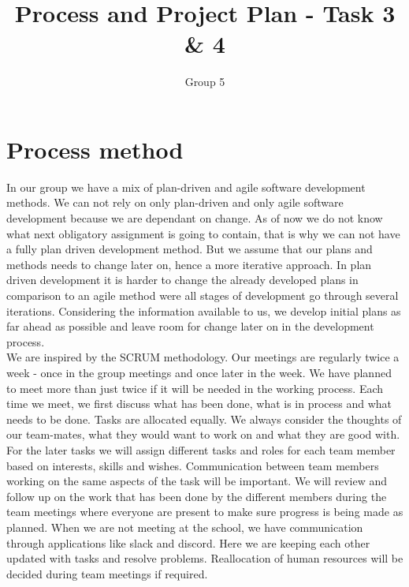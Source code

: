 \documentclass{article}
\title{Process and Project Plan - Task 3 \& 4}
\author{Group 5}
\date{}
\begin{document}
    \maketitle
    
    \section{Process method}
    \noindent
    In our group we have a mix of plan-driven and agile software development methods. We can not rely on only plan-driven and only agile software development because we are dependant on change. As of now we do not know what next obligatory assignment is going to contain, that is why we can not have a fully plan driven development method. But we assume that our plans and methods needs to change later on, hence a more iterative approach. In plan driven development it is harder to change the already developed plans in comparison to an agile method were all stages of development go through several iterations. Considering the information available to us, we develop initial plans as far ahead as possible and leave room for change later on in the development process. \\

    \noindent
    We are inspired by the SCRUM methodology. Our meetings are regularly twice a week - once in the group meetings and once later in the week. We have planned to meet more than just twice if it will be needed in the working process. Each time we meet, we first discuss what has been done, what is in process and what needs to be done. Tasks are allocated equally. We always consider the thoughts of our team-mates, what they would want to work on and what they are good with. \\
    
    \noindent
    For the later tasks we will assign different tasks and roles for each team member based on interests, skills and wishes. Communication between team members working on the same aspects of the task will be important. We will review and follow up on the work that has been done by the different members during the team meetings where everyone are present to make sure progress is being made as planned. When we are not meeting at the school, we have communication through applications like slack and discord. Here we are keeping each other updated with tasks and resolve problems. Reallocation of human resources will be decided during team meetings if required. 

    
\end{document}
